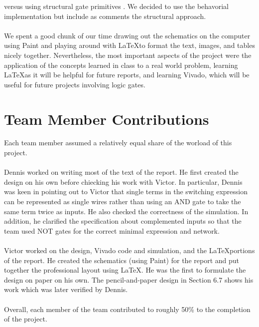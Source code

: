 \documentclass{article}
\begin{document}
versus using structural gate primitives . We decided to use the behavorial 
implementation but include as comments the structural approach. \\
\\
We spent a good chunk of our time drawing out the schematics on the computer 
using Paint and playing around with \LaTeX to format the text, images, and 
tables nicely together. Nevertheless, the most important aspects of the 
project were the application of the concepts learned in class to a real world 
problem, learning \LaTeX as it will be helpful for future reports, and 
learning Vivado, which will be useful for future projects involving logic 
gates.


\section{Team Member Contributions}
Each team member assumed a relatively equal share of the worload of this 
project.\\
\\
Dennis worked on writing most of the text of the report. He first created the 
design on his own before chiecking his work with Victor. In particular, Dennis 
was keen in pointing out to Victor that single terms in the switching 
expression can be represented as single wires rather than using an AND gate 
to take the same term twice as inputs. He also checked the 
correctness of the simulation.  In addition, he clarified the specification 
about complemented inputs so that the team used NOT gates for the correct 
minimal expression and network. \\
\\
Victor worked on the design, Vivado code and simulation, and the \LaTeX portions
 of the report. He created the schematics (using Paint) for the report and 
put together the professional layout using \LaTeX. He was the first to 
formulate the design on paper on his own.  The pencil-and-paper design in 
Section 6.7 shows his work which was later verified by Dennis. \\
\\
Overall, each member of the team contributed to roughly 50\% to the completion 
of the project.

\end{document}
